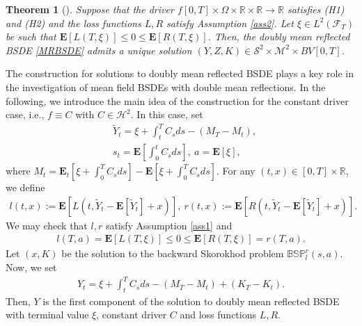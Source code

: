 \documentclass[10pt]{article}%
\numberwithin{equation}{section}
\newtheorem{theorem}{Theorem}[section]
\def \E{\mathbf{E}}
\begin{document}
 \begin{theorem}[\cite{Li'}]\label{existence and uniqueness for MRBSDE}
Suppose that the driver $f[0,T]\times\Omega\times\mathbb{R}\times\mathbb{R}\rightarrow \mathbb{R}$ satisfies (H1) and (H2) and the loss functions $L,R$ satisfy Assumption \ref{ass2}. Let $\xi\in L^2(\mathcal{F}_T)$ be such that $\E[L(T,\xi)]\leq 0\leq \E[R(T,\xi)]$. Then, the doubly mean reflected BSDE \eqref{MRBSDE} admits a unique solution $(Y,Z,K)\in \mathcal{S}^2\times\mathcal{M}^2\times BV[0,T]$. 
 \end{theorem}
 
The construction for solutions to doubly mean reflected BSDE plays a key role in the investigation of mean field BSDEs with double mean reflections. In the following, we introduce the main idea of the construction for the constant driver case, i.e., $f\equiv C$ with $C\in \mathcal{H}^2$. In this case, set
\begin{align*}
&\widetilde{Y}_t=\xi+\int_t^T C_s ds-(M_T-M_t),\\
&s_t=\E[\int_0^t C_sds], \ a=\E[\xi],
\end{align*}
where $M_t=\E_t[\xi+\int_0^T C_s ds]-\E[\xi+\int_0^T C_s ds]$. For any $(t,x)\in[0,T]\times \mathbb{R}$, we define
\begin{align}\label{lr}
l(t,x):=\E[L(t,\widetilde{Y}_t-\E[\widetilde{Y}_t]+x)], \ r(t,x):=\E[R(t,\widetilde{Y}_t-\E[\widetilde{Y}_t]+x)].
\end{align}
We may check that $l,r$ satisfy Assumption \ref{ass1} and 
\begin{align*}
l(T,a)=\E[L(T,\xi)]\leq 0\leq \E[R(T,\xi)]=r(T,a).
\end{align*}
Let $(x,K)$ be the solution to the backward Skorokhod problem $\mathbb{BSP}_l^r(s,a)$. Now, we set 
\begin{align*}
Y_t=\xi+\int_t^T C_s ds-(M_T-M_t)+(K_T-K_t).%
\end{align*}
Then, $Y$ is the first component of the solution to doubly mean reflected BSDE with terminal value $\xi$, constant driver $C$ and loss functions $L,R$. 
\end{document}
